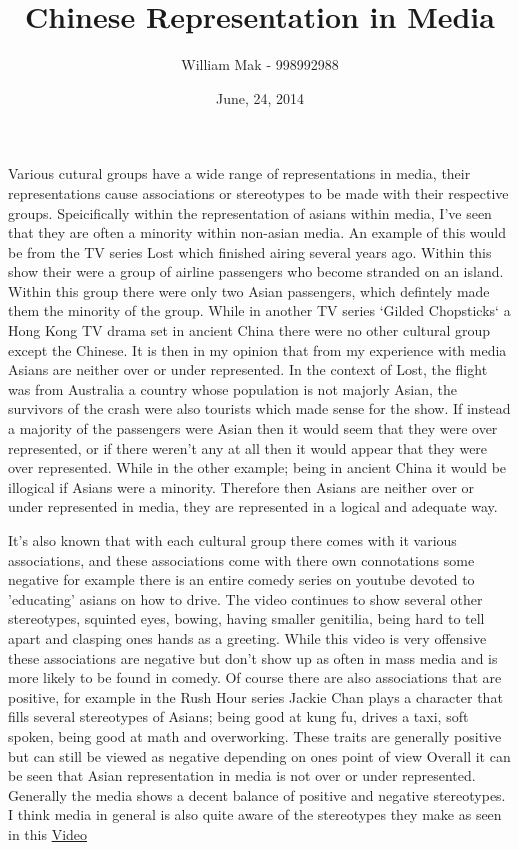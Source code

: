 \documentclass[12pt]{article}
\title{Chinese Representation in Media}
\author{William Mak - 998992988}
\date{June, 24, 2014}
\begin{document}
\maketitle

	Various cutural groups have a wide range of representations in media, their
	representations cause associations or stereotypes to be made with their
	respective groups. Speicifically within the representation of asians within
	media, I've seen that they are often a minority within non-asian media. An
	example of this would be from the TV series Lost which finished airing
	several years ago. Within this show their were a group of airline passengers
	who become stranded on an island. Within this group there were only two
	Asian passengers, which defintely made them the minority of the group. While
	in another TV series `Gilded Chopsticks` a Hong Kong TV drama set in ancient
	China there were no other cultural group except the Chinese. It is then in
	my opinion that from my experience with media Asians are neither over or
	under represented. In the context of Lost, the flight was from Australia a
	country whose population is not majorly Asian, the survivors of the crash
	were also tourists which made sense for the show. If instead a majority of
	the passengers were Asian then it would seem that they were over
	represented, or if there weren't any at all then it would appear that they
	were over represented. While in the other example; being in ancient China
	it would be illogical if Asians were a minority. Therefore then Asians are
	neither over or under represented in media, they are represented in a
	logical and adequate way.
	
	It's also known that with each cultural group there comes with it various
	associations, and these associations come with there own connotations some 
	negative for example there is an entire comedy series on youtube devoted to
	'educating' asians on how to drive. The video continues to show several
	other stereotypes, squinted eyes, bowing, having smaller genitilia, being
	hard to tell apart	and clasping ones hands as a
	greeting. While this video is very offensive 
	these associations are negative but don't show up as often in mass
	media and is more likely to be found in comedy. Of course there are also 
	associations that are positive, for
	example in the Rush Hour series Jackie Chan plays a character that fills
	several stereotypes of Asians; being good at kung fu, drives a taxi, soft
	spoken, being good at math and overworking. These traits are generally
	positive but can still be viewed as negative depending on ones point of view 
	Overall it can be seen that 
	Asian representation in media is not over or under represented. Generally 
	the media shows a decent balance of positive and negative stereotypes. I
	think media in general is also quite aware of the stereotypes they make as
	seen in this \href{https://www.youtube.com/watch?v=VDjgfWAL5UQ}{Video}
\end{document}
